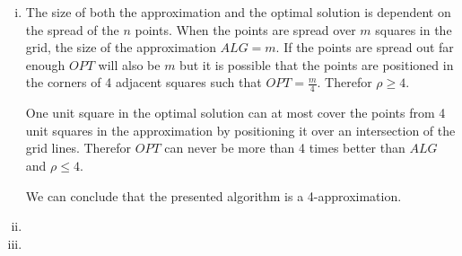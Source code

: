 \begin{enumerate}[(i)]
	\item The size of both the approximation and the optimal solution is dependent on the spread of the $n$ points. When the points are spread over $m$ squares in the grid, the size of the approximation $ALG = m$. If the points are spread out far enough $OPT$ will also be $m$ but it is possible that the points are positioned in the corners of 4 adjacent squares such that $OPT = \frac{m}{4}$. Therefor $\rho \geq 4$. 

One unit square in the optimal solution can at most cover the points from 4 unit squares in the approximation by positioning it over an intersection of the grid lines. Therefor $OPT$ can never be more than 4 times better than $ALG$ and $\rho \leq 4$.  

We can conclude that the presented algorithm is a 4-approximation.
	\item
	\item
\end{enumerate}

